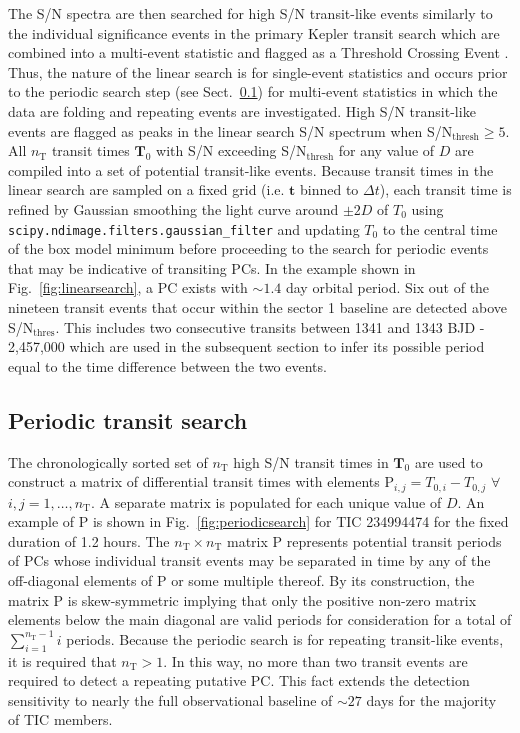 The S/N spectra are then searched for high S/N transit-like events similarly to the individual
significance events in the primary Kepler transit search which are combined into a multi-event
statistic and flagged as a Threshold Crossing Event \citep{jenkins10}.
Thus, the nature of the linear search is for single-event statistics and occurs prior
to the periodic search step (see Sect.~\ref{sect:periodic}) for multi-event statistics in
which the data are folding and repeating events are investigated.
High S/N transit-like events are flagged as peaks in the linear search S/N spectrum when
S/N$_{\text{thresh}}\geq 5$.
All $n_{\text{T}}$ transit times $\mathbf{T}_0$ with S/N exceeding S/N$_{\text{thresh}}$ for
any value of $D$ are compiled into a set of potential transit-like events.
Because transit times in the linear search are sampled on a fixed grid (i.e.
$\mathbf{t}$ binned to $\Delta t$), each transit time is refined by Gaussian smoothing the light curve
around $\pm 2D$ of $T_0$ using \texttt{scipy.ndimage.filters.gaussian\_filter} and updating $T_0$ to the
central time of the box model minimum before proceeding to the search for periodic events that may
be indicative of transiting PCs. In the example shown in Fig.~\ref{fig:linearsearch},
a PC exists with $\sim 1.4$ day orbital period. Six out of the nineteen transit events
that occur within the sector 1 baseline are detected above S/N$_{\text{thres}}$. This includes two
consecutive transits between 1341 and 1343 BJD - 2,457,000 which are used in the subsequent
section to infer its possible period equal to the time difference between the two events.  \\


\subsection{Periodic transit search} \label{sect:periodic}
The chronologically sorted set of $n_{\text{T}}$ high S/N transit times in $\mathbf{T}_0$
are used to construct a matrix of differential transit times with
elements P$_{i,j} = T_{0,i} - T_{0,j}$ $\forall$ $i,j=1,\dots,n_{\text{T}}$.
A separate matrix is populated for each unique value of $D$. An example of
P is shown in Fig.~\ref{fig:periodicsearch} for TIC 234994474 for the fixed duration of 1.2 hours. 
The $n_{\text{T}} \times n_{\text{T}}$ matrix P represents potential transit periods of
PCs whose individual transit events
may be separated in time by any of the off-diagonal elements of P or some multiple thereof.
By its construction, the matrix P is skew-symmetric implying that only the positive non-zero matrix elements
below the main diagonal are valid periods for consideration for a total of $\sum_{i=1}^{n_{\text{T}}-1}i$ periods.
Because the periodic search is for repeating transit-like events, it is required that $n_{\text{T}}>1$. In this
way, no more than two transit events are required to detect a repeating putative 
PC. This fact extends the \pipeline{} detection sensitivity to nearly the full observational baseline
of $\sim 27$ days for the majority of TIC members. \\


